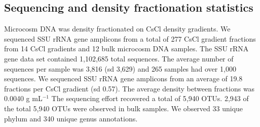 \documentclass{article}
\begin{document}
\subsection{Sequencing and density fractionation statistics}\label{seq_stats}
Microcosm DNA was density fractionated on CsCl density gradients. We sequenced
SSU rRNA gene amplicons from a total of 277 CsCl gradient fractions from 14
CsCl gradients and 12 bulk microcosm DNA samples. The SSU rRNA gene data set
contained 1,102,685 total sequences. The average number of sequences per sample
was 3,816 (sd 3,629) and 265 samples had over 1,000 sequences. We sequenced SSU
rRNA gene amplicons from an average of 19.8 fractions per CsCl gradient (sd
0.57). The average density between fractions was  0.0040 g mL$^{-1}$ The
sequencing effort recovered a total of 5,940 OTUs. 2,943 of the total 5,940
OTUs were observed in bulk samples. We observed 33 unique phylum and 340 unique
genus annotations.


\end{document}

